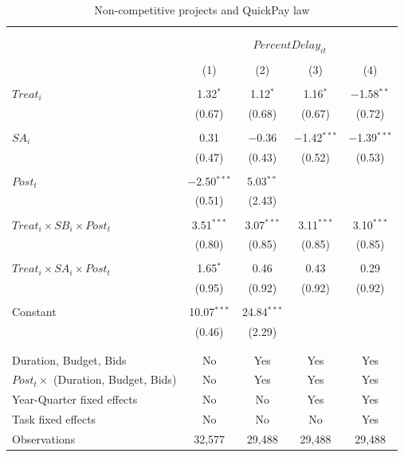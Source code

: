 \documentclass[
]{article}
\begin{document}
\begin{table}[H] \centering 
  \caption{Non-competitive projects and QuickPay law} 
  \label{} 
\small 
\begin{tabular}{@{\extracolsep{-2pt}}lcccc} 
\\[-1.8ex]\hline 
\hline \\[-1.8ex] 
\\[-1.8ex] & \multicolumn{4}{c}{$PercentDelay_{it}$  } \\ 
\\[-1.8ex] & (1) & (2) & (3) & (4)\\ 
\hline \\[-1.8ex] 
 $Treat_i$ & 1.32$^{*}$ & 1.12$^{*}$ & 1.16$^{*}$ & $-$1.58$^{**}$ \\ 
  & (0.67) & (0.68) & (0.67) & (0.72) \\ 
  & & & & \\ 
 $SA_i$ & 0.31 & $-$0.36 & $-$1.42$^{***}$ & $-$1.39$^{***}$ \\ 
  & (0.47) & (0.43) & (0.52) & (0.53) \\ 
  & & & & \\ 
 $Post_t$ & $-$2.50$^{***}$ & 5.03$^{**}$ &  &  \\ 
  & (0.51) & (2.43) &  &  \\ 
  & & & & \\ 
 $Treat_i \times SB_i \times Post_t$ & 3.51$^{***}$ & 3.07$^{***}$ & 3.11$^{***}$ & 3.10$^{***}$ \\ 
  & (0.80) & (0.85) & (0.85) & (0.85) \\ 
  & & & & \\ 
 $Treat_i \times SA_i \times Post_t$ & 1.65$^{*}$ & 0.46 & 0.43 & 0.29 \\ 
  & (0.95) & (0.92) & (0.92) & (0.92) \\ 
  & & & & \\ 
 Constant & 10.07$^{***}$ & 24.84$^{***}$ &  &  \\ 
  & (0.46) & (2.29) &  &  \\ 
  & & & & \\ 
\hline \\[-1.8ex] 
Duration, Budget, Bids & No & Yes & Yes & Yes \\ 
$Post_t \times $  (Duration, Budget, Bids) & No & Yes & Yes & Yes \\ 
Year-Quarter fixed effects & No & No & Yes & Yes \\ 
Task fixed effects & No & No & No & Yes \\ 
Observations & 32,577 & 29,488 & 29,488 & 29,488 \\ 

\end{tabular}
\end{table}
\end{document}
